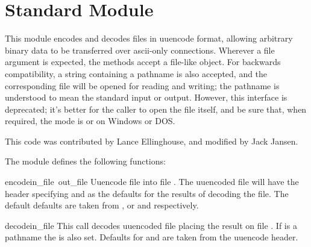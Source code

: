 \section{Standard Module }
\label{module-uu}

This module encodes and decodes files in uuencode format, allowing
arbitrary binary data to be transferred over ascii-only connections.
Wherever a file argument is expected, the methods accept a file-like
object.  For backwards compatibility, a string containing a pathname
is also accepted, and the corresponding file will be opened for
reading and writing; the pathname  is understood to mean the
standard input or output.  However, this interface is deprecated; it's
better for the caller to open the file itself, and be sure that, when
required, the mode is  or  on Windows or DOS.

This code was contributed by Lance Ellinghouse, and modified by Jack
Jansen.

The  module defines the following functions:


\begin{funcdesc}{encode}{in_file\, out_file}
Uuencode file  into file .  The uuencoded
file will have the header specifying  and  as the
defaults for the results of decoding the file. The default defaults
are taken from , or  and 
respectively. 
\end{funcdesc}

\begin{funcdesc}{decode}{in_file}
This call decodes uuencoded file  placing the result on
file . If  is a pathname the  is
also set. Defaults for  and  are taken from
the uuencode header.
\end{funcdesc}

